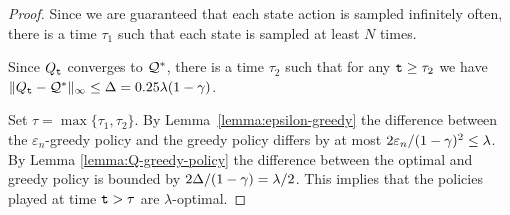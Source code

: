 \begin{advanced}
\begin{proof}
Since we are guaranteed that each state action is sampled infinitely
often, there is a time $\tau_1$ such that each state is sampled at
least $N$ times.

Since $Q_{\tt t}$ converges to $\mathcal{Q}^*$, there is a time $\tau_2$ such that for any ${\tt t}\geq \tau_2$ we have $\|Q_{\tt t}-\mathcal{Q}^*\|_\infty \leq \Delta=0.25\lambda (1-\gamma)$.

Set $\tau=\max\{\tau_1,\tau_2\}$. By
Lemma~\ref{lemma:epsilon-greedy} the difference between the
$\varepsilon_n$-greedy policy and the greedy policy differs by at most $2\varepsilon_n/(1-\gamma)^2\leq \lambda$. By Lemma
\ref{lemma:Q-greedy-policy} the difference between the optimal and
greedy policy is bounded by $2\Delta/(1-\gamma)=\lambda/2$. This
implies that the policies played at time ${\tt t}>\tau$ are
$\lambda$-optimal.
\end{proof}











\end{advanced}

